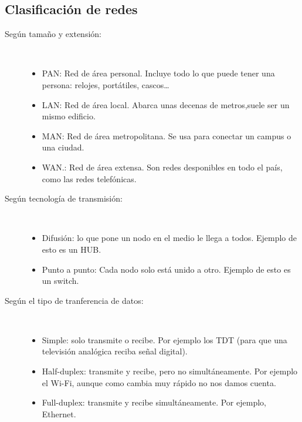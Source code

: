 \subsection{Clasificación de redes}
\begin{description}
    \item[Según tamaño y extensión:] \
    \begin{itemize}
        \item \acrfull{PAN}: Red de área personal. Incluye todo lo que puede tener una persona: relojes, portátiles, cascos\ldots
        \item \acrfull{LAN}: Red de área local. Abarca unas decenas de metros,suele ser un mismo edificio. 
        \item \acrfull{MAN}: Red de área metropolitana. Se usa para conectar un campus o una ciudad. 
        \item \acrfull{WAN}.: Red de área extensa. Son redes desponibles en todo el país, como las redes telefónicas.
    \end{itemize}
    \item[Según tecnología de transmisión:]\
    \begin{itemize}
        \item Difusión: lo que pone un nodo en el medio le llega a todos. Ejemplo de esto es un HUB\@.
        \item Punto a punto: Cada nodo solo está unido a otro. Ejemplo de esto es un switch.
    \end{itemize}
    \item[Según el tipo de tranferencia de datos:] \
    \begin{itemize}
        \item Simple: solo transmite o recibe. Por ejemplo los TDT (para que una televisión analógica reciba señal digital).
        \item Half-duplex: transmite y recibe, pero no simultáneamente. Por ejemplo el Wi-Fi, aunque como cambia muy rápido  no nos damos cuenta.
        \item Full-duplex: transmite y recibe simultáneamente. Por ejemplo, Ethernet. 
    \end{itemize}
\end{description}

